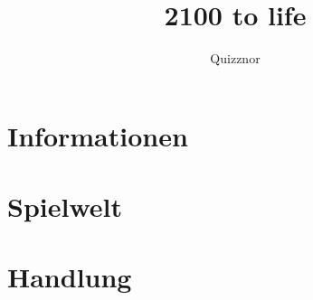 \documentclass{include/protokollclass}
\title{2100 to life}
\author{Quizznor}
\begin{document}
\maketitle
\tableofcontents

\chapter{Informationen}


\chapter{Spielwelt}

\chapter{Handlung}
\end{document}
